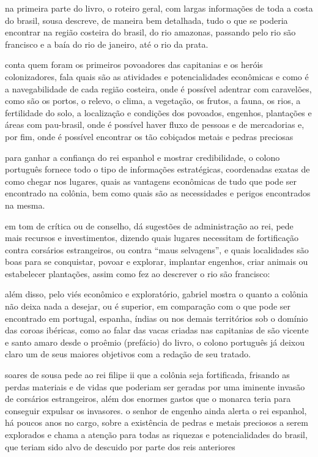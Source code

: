 na primeira parte do livro, o roteiro geral, com largas informações de toda a costa do brasil, sousa descreve, de maneira bem detalhada, tudo o que se poderia encontrar na região costeira do brasil, do rio amazonas, passando pelo rio são francisco e a baía do rio de janeiro, até o rio da prata.

conta quem foram os primeiros povoadores das capitanias e os heróis colonizadores, fala quais são as atividades e potencialidades econômicas e como é a navegabilidade de cada região costeira, onde é possível adentrar com caravelões, como são os portos, o relevo, o clima, a vegetação, os frutos, a fauna, os rios, a fertilidade do solo, a localização e condições dos povoados, engenhos, plantações e áreas com pau-brasil, onde é possível haver fluxo de pessoas e de mercadorias e, por fim, onde é possível encontrar os tão cobiçados metais e pedras preciosas

para ganhar a confiança do rei espanhol e mostrar credibilidade, o colono português fornece todo o tipo de informações estratégicas, coordenadas exatas de como chegar nos lugares, quais as vantagens econômicas de tudo que pode ser encontrado na colônia, bem como quais são as necessidades e perigos encontrados na mesma.

em tom de crítica ou de conselho, dá sugestões de administração ao rei, pede mais recursos e investimentos, dizendo quais lugares necessitam de fortificação contra corsários estrangeiros, ou contra “maus selvagens”, e quais localidades são boas para se conquistar, povoar e explorar, implantar engenhos, criar animais ou estabelecer plantações, assim como fez ao descrever o rio são francisco:

além disso, pelo viés econômico e exploratório, gabriel mostra o quanto a colônia não deixa nada a desejar, ou é superior, em comparação com o que pode ser encontrado em portugal, espanha, índias ou nos demais territórios sob o domínio das coroas ibéricas, como ao falar das vacas criadas nas capitanias de são vicente e santo amaro
desde o proêmio (prefácio) do livro, o colono português já deixou claro um de seus maiores objetivos com a redação de seu tratado.

soares de sousa pede ao rei filipe ii que a colônia seja fortificada, frisando as perdas materiais e de vidas que poderiam ser geradas por uma iminente invasão de corsários estrangeiros, além dos enormes gastos que o monarca teria para conseguir expulsar os invasores.
o senhor de engenho ainda alerta o rei espanhol, há poucos anos no cargo, sobre a existência de pedras e metais preciosos a serem explorados e chama a atenção para todas as riquezas e potencialidades do brasil, que teriam sido alvo de descuido por parte dos reis anteriores

